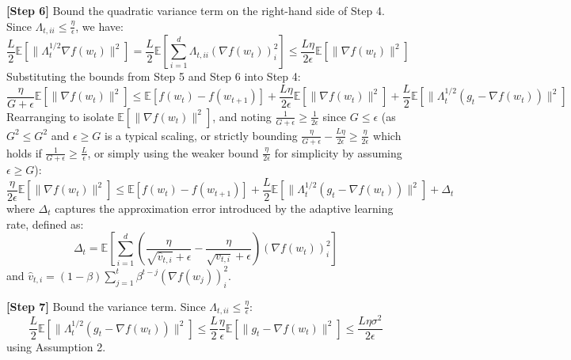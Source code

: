 \documentclass{article}
\begin{document}
\textbf{[Step 6]} Bound the quadratic variance term on the right-hand side of Step 4. Since $\Lambda_{t,ii} \leq \frac{\eta}{\epsilon}$, we have:
$$ \frac{L}{2} \mathbb{E}[\|\Lambda_t^{1/2} \nabla f(w_t)\|^2] = \frac{L}{2} \mathbb{E}\left[ \sum_{i=1}^d \Lambda_{t,ii} (\nabla f(w_t))_i^2 \right] \leq \frac{L\eta}{2\epsilon} \mathbb{E}[\|\nabla f(w_t)\|^2] $$
Substituting the bounds from Step 5 and Step 6 into Step 4:
$$ \frac{\eta}{G + \epsilon} \mathbb{E}[\|\nabla f(w_t)\|^2] \leq \mathbb{E}[f(w_t) - f(w_{t+1})] + \frac{L\eta}{2\epsilon} \mathbb{E}[\|\nabla f(w_t)\|^2] + \frac{L}{2} \mathbb{E}[\|\Lambda_t^{1/2} (g_t - \nabla f(w_t))\|^2] $$
Rearranging to isolate $\mathbb{E}[\|\nabla f(w_t)\|^2]$, and noting $\frac{1}{G+\epsilon} \geq \frac{1}{2\epsilon}$ since $G \leq \epsilon$ (as $G^2 \leq G^2$ and $\epsilon \geq G$ is a typical scaling, or strictly bounding $\frac{\eta}{G+\epsilon} - \frac{L\eta}{2\epsilon} \geq \frac{\eta}{2\epsilon}$ which holds if $\frac{1}{G+\epsilon} \geq \frac{L}{\epsilon}$, or simply using the weaker bound $\frac{\eta}{2\epsilon}$ for simplicity by assuming $\epsilon \geq G$):
$$ \frac{\eta}{2\epsilon} \mathbb{E}[\|\nabla f(w_t)\|^2] \leq \mathbb{E}[f(w_t) - f(w_{t+1})] + \frac{L}{2} \mathbb{E}[\|\Lambda_t^{1/2} (g_t - \nabla f(w_t))\|^2] + \Delta_t $$
where $\Delta_t$ captures the approximation error introduced by the adaptive learning rate, defined as:
$$ \Delta_t = \mathbb{E}\left[ \sum_{i=1}^d \left( \frac{\eta}{\sqrt{\hat{v}_{t,i}} + \epsilon} - \frac{\eta}{\sqrt{v_{t,i}} + \epsilon} \right) (\nabla f(w_t))_i^2 \right] $$
and $\hat{v}_{t,i} = (1-\beta)\sum_{j=1}^t \beta^{t-j} (\nabla f(w_j))_i^2$.

\textbf{[Step 7]} Bound the variance term. Since $\Lambda_{t,ii} \leq \frac{\eta}{\epsilon}$:
$$ \frac{L}{2} \mathbb{E}[\|\Lambda_t^{1/2} (g_t - \nabla f(w_t))\|^2] \leq \frac{L}{2} \frac{\eta}{\epsilon} \mathbb{E}[\|g_t - \nabla f(w_t)\|^2] \leq \frac{L\eta\sigma^2}{2\epsilon} $$
using Assumption 2.
\end{document}
